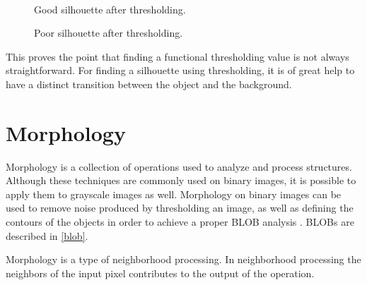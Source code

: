 \begin{figure}[htbp]
\begin{minipage}[b]{0.45\textwidth}
\end{minipage} \\ %
\begin{minipage}[t]{0.45\textwidth}
\caption{Good silhouette after thresholding.} %
\label{fig:SimpleThresholdAfter}
\end{minipage} \hfill
\begin{minipage}[t]{0.45\textwidth}
\caption{Poor silhouette after thresholding.} %
\label{fig:ComplicatedThresholdAfter}
\end{minipage}
\end{figure}
 
This proves the point that finding a functional thresholding value is not always straightforward. For finding a silhouette using thresholding, it is of great help to have a distinct transition between the object and the background.

\section{Morphology}
Morphology is a collection of operations used to analyze and process structures. Although these techniques are commonly used on binary images, it is possible to apply them to grayscale images as well. Morphology on binary images can be used to remove noise produced by thresholding an image, as well as defining the contours of the objects in order to achieve a proper BLOB analysis \citep{ip_book}. BLOBs are described in \ref{blob}.

Morphology is a type of neighborhood processing. In neighborhood processing the neighbors of the input pixel contributes to the output of the operation.


